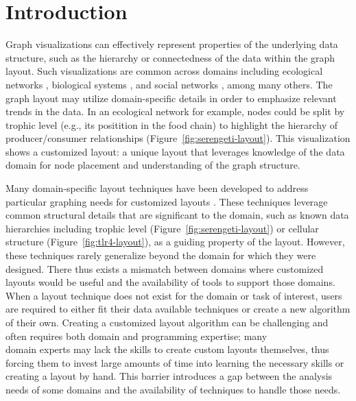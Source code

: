 \section{Introduction}
Graph visualizations can effectively represent properties of the underlying
data structure, such as the hierarchy or connectedness of the data within
the graph layout. Such visualizations are common across domains including
ecological networks
\cite{hinke2004visualizing,harper2006dynamic,lavigne1996cod,baskerville2011spatial,yodzis1998local,cohen2003ecological,kearney2016blog,benson2016higher},
biological systems
\cite{barsky2008cerebral,shannon2003cytoscape,gehlenborg2010visualization,saraiya2005visualizing,becker2001graph},
and social networks \cite{rothenberg1998using} , among many others. The graph layout may utilize
domain-specific details in order to emphasize relevant trends in the
data. In an ecological network for example, nodes could be split by trophic
level (e.g., its positition in the food chain) to highlight the hierarchy
of producer/consumer relationships
(Figure~\ref{fig:serengeti-layout}). This visualization shows a customized
layout: a unique layout that leverages knowledge of the data domain for
node placement and understanding of the graph structure.

Many domain-specific layout techniques have been developed to address
particular graphing needs for customized layouts
\cite{barsky2008cerebral,shannon2003cytoscape,kearney2017d3,kearney2017ecopath}. These
techniques leverage common structural details that are significant to the
domain, such as known data hierarchies including trophic level
(Figure~\ref{fig:serengeti-layout}) or cellular structure
(Figure~\ref{fig:tlr4-layout}), as a guiding property of the
layout. However, these techniques rarely generalize beyond the domain for
which they were designed. There thus exists a mismatch between domains
where customized layouts would be useful and the availability of tools to
support those domains. When a layout technique does not exist for the
domain or task of interest, users are required to either fit their data
available techniques or create a new algorithm of their own. Creating a
customized layout algorithm can be challenging and often requires both
domain and programming expertise; many \serengetiLayoutColumn \\domain
experts may lack the skills to create custom layouts themselves, thus
forcing them to invest large amounts of time into learning the necessary
skills or creating a layout by hand. This barrier introduces a gap between
the analysis needs of some domains and the availability of techniques to
handle those needs.

